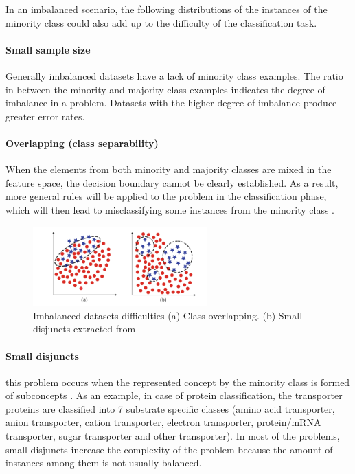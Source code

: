 In an imbalanced scenario, the following distributions of the instances of the minority 
class could also add up to the difficulty of the classification task. 

\paragraph{Small sample size} Generally imbalanced datasets have a lack of minority class examples. 
The ratio in between the minority and majority class examples indicates the degree of imbalance 
in a problem. Datasets with the higher degree of imbalance produce greater error rates.

\paragraph{Overlapping (class separability)} When the elements from both minority and majority classes 
are mixed in the feature space, the decision boundary cannot be clearly established. As a result, 
more general rules will be applied to the problem in the classification phase, which will then lead 
to misclassifying some instances from the minority class \cite{garcia_k-nn_2008}.

\begin{figure}[ht]
    \centering
    \includegraphics[width=0.60\textwidth]{figures/09overlapping.png}
    \caption{Imbalanced datasets difficulties (a) Class overlapping. (b) Small disjuncts 
    extracted from~\cite{fernandez_learning_2018}}
    \label{fig:overlapping}
\end{figure}

\paragraph{Small disjuncts} this problem occurs when the represented concept by the minority class is 
formed of subconcepts \cite{weiss_learning_2003}. As an example, in case of protein classification, the transporter 
proteins are classified into 7 substrate specific classes (amino acid transporter, anion 
transporter, cation transporter, electron transporter, protein/mRNA transporter, sugar transporter 
and other transporter). In most of the problems, small disjuncts increase the complexity of the 
problem because the amount of instances among them is not usually balanced.

